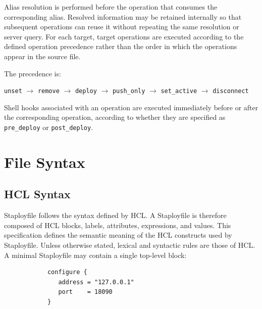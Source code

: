 \documentclass[11pt,a4paper]{article}
\begin{document}
    Alias resolution is performed before the operation that consumes the corresponding alias.
    Resolved information may be retained internally so that subsequent operations can reuse it without repeating the same resolution or server query.
    For each target, target operations are executed according to the defined operation precedence rather than the order in which the
    operations appear in the source file.

    The precedence is:

    \begin{center}
        \texttt{unset}
        $\rightarrow$
        \texttt{remove}
        $\rightarrow$
        \texttt{deploy}
        $\rightarrow$
        \texttt{push\_only}
        $\rightarrow$
        \texttt{set\_active}
        $\rightarrow$
        \texttt{disconnect}
    \end{center}

    Shell hooks associated with an operation are executed immediately before
    or after the corresponding operation, according to whether they are
    specified as \texttt{pre\_deploy} or \texttt{post\_deploy}.


    \section{File Syntax}\label{sec:file-syntax}

    \subsection{HCL Syntax}\label{subsec:hcl-syntax}

    Staployfile follows the syntax defined by HCL. A Staployfile is
    therefore composed of HCL blocks, labels, attributes, expressions, and values.
    This specification defines the semantic meaning of the HCL constructs used by Staployfile.
    Unless otherwise stated, lexical and syntactic rules are those of HCL.\\
    A minimal Staployfile may contain a single top-level block:

    \begin{center}
        \begin{verbatim}
            configure {
               address = "127.0.0.1"
               port    = 18090
            }
        \end{verbatim}
    \end{center}
\end{document}
